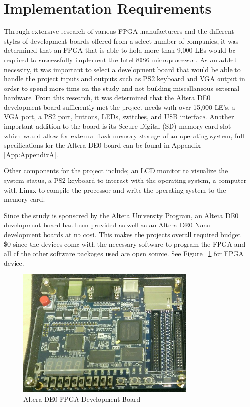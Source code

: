 \documentclass[pdftex,10.5pt]{report}
\begin{document}
\newpage

\section{Implementation Requirements}
Through extensive research of various FPGA manufacturers and the different styles of development boards offered from a select number of companies, it was determined that an FPGA that is able to hold more than 9,000 LEs would be required to successfully implement the Intel 8086 microprocessor. As an added necessity, it was important to select a development board that would be able to handle the project inputs and outputs such as PS2 keyboard and VGA output in order to spend more time on the study and not building miscellaneous external hardware. From this research, it was determined that the Altera DE0 development board sufficiently met the project needs with over 15,000 LE's, a VGA port, a PS2 port, buttons, LEDs, switches, and USB interface. Another important addition to the board is its Secure Digital (SD) memory card slot which would allow for external flash memory storage of an operating system, full specifications for the Altera DE0 board can be found in Appendix \ref{App:AppendixA}.

Other components for the project include; an LCD monitor to visualize the system status, a PS2 keyboard to interact with the operating system, a computer with Linux to compile the processor and write the operating system to the memory card.

Since the study is sponsored by the Altera University Program, an Altera DE0 development board has been provided as well as an Altera DE0-Nano development boards at no cost. This makes the projects overall required budget \$0 since the devices come with the necessary software to program the FPGA and all of the other software packages used are open source. See Figure ~\ref{fig:DE0} for FPGA device.

\begin{figure}[!h]
	\centering
	\includegraphics[width=3.5in]{figures/DE0}
	\caption{Altera DE0 FPGA Development Board}
	\label{fig:DE0}
\end{figure}
\end{document}
